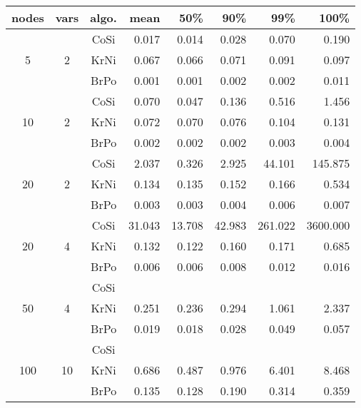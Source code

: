 \begin{tabular}{|c|c|c|r|r|r|r|r|}
  \hline
  nodes & vars & algo. & mean & 50\% & 90\% & 99\% & 100\% \\
  \hline
  \hline
  \multirow{3}{*}{5}&
  \multirow{3}{*}{2}&
     CoSi &      0.017 &      0.014 &      0.028 &      0.070 &      0.190 \\
  && KrNi &      0.067 &      0.066 &      0.071 &      0.091 &      0.097 \\
  && BrPo &      0.001 &      0.001 &      0.002 &      0.002 &      0.011 \\
  \hline
  \multirow{3}{*}{10}&
  \multirow{3}{*}{2}&
     CoSi &      0.070 &      0.047 &      0.136 &      0.516 &      1.456 \\
  && KrNi &      0.072 &      0.070 &      0.076 &      0.104 &      0.131 \\
  && BrPo &      0.002 &      0.002 &      0.002 &      0.003 &      0.004 \\
  \hline
  \multirow{3}{*}{20}&
  \multirow{3}{*}{2}&
     CoSi &      2.037 &      0.326 &      2.925 &     44.101 &    145.875 \\
  && KrNi &      0.134 &      0.135 &      0.152 &      0.166 &      0.534 \\
  && BrPo &      0.003 &      0.003 &      0.004 &      0.006 &      0.007 \\
  \hline
  \multirow{3}{*}{20}&
  \multirow{3}{*}{4}&
     CoSi &  31.043 &     13.708 &     42.983 &    261.022 & 3600.000 \\
  && KrNi &      0.132 &      0.122 &      0.160 &      0.171 &      0.685 \\
  && BrPo &      0.006 &      0.006 &      0.008 &      0.012 &      0.016 \\
  \hline
  \multirow{3}{*}{50}&
  \multirow{3}{*}{4}&
     CoSi &      \skip &      \skip &      \skip &      \skip &      \skip \\
  && KrNi &      0.251 &      0.236 &      0.294 &      1.061 &      2.337 \\
  && BrPo &      0.019 &      0.018 &      0.028 &      0.049 &      0.057 \\
  \hline
  \multirow{3}{*}{100}&
  \multirow{3}{*}{10}&
     CoSi &      \skip &      \skip &      \skip &      \skip &      \skip \\
  && KrNi &      0.686 &      0.487 &      0.976 &      6.401 &      8.468 \\
  && BrPo &      0.135 &      0.128 &      0.190 &      0.314 &      0.359 \\

\end{tabular}
